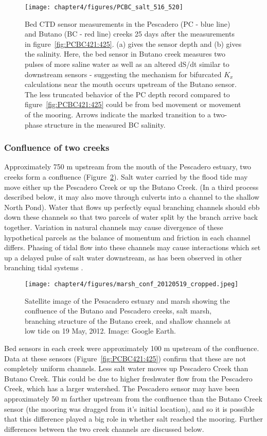 \begin{figure}
	\texttt{[image: chapter4/figures/PCBC\_salt\_516\_520]}
	\caption{Bed CTD sensor measurements in the Pescadero (PC - blue line) and Butano (BC - red line) creeks 25 days after the measurements in figure~\ref{fig:PCBC421:425}. (a) gives the sensor depth and (b) gives the salinity. Here, the bed sensor in Butano creek measures two pulses of more saline water as well as an altered dS/dt similar to downstream sensors - suggesting the mechanism for bifurcated $K_x$ calculations near the mouth occurs upstream of the Butano sensor. The less truncated behavior of the PC depth record compared to figure~\ref{fig:PCBC421:425} could be from bed movement or movement of the mooring. Arrows indicate the marked transition to a two-phase structure in the measured BC salinity.}  \label{fig:PCBC511:516}
\end{figure}


\subsubsection{Confluence of two creeks}
Approximately 750 m upstream from the mouth of the Pescadero estuary, two creeks form a confluence (Figure~\ref{fig:geMarsh}). Salt water carried by the flood tide may move either up the Pescadero Creek or up the Butano Creek. (In a third process described below, it may also move through culverts into a channel to the shallow North Pond). Water that flows up perfectly equal branching channels should ebb down these channels so that two parcels of water split by the branch arrive back together. Variation in natural channels may cause divergence of these hypothetical parcels as the balance of momentum and friction in each channel differs. Phasing of tidal flow into these channels may cause interactions which set up a delayed pulse of salt water downstream, as has been observed in other branching tidal systems \parencite{macvean_estuarine_2011}.


\begin{figure}
\centering
	\texttt{[image: chapter4/figures/marsh\_conf\_20120519\_cropped.jpeg]}
	\caption{Satellite image of the Pesacadero estuary and marsh showing the confluence of the Butano and Pescadero creeks, salt marsh, branching structure of the Butano creek, and shallow channels at low tide on 19 May, 2012. Image: Google Earth.} \label{fig:geMarsh}
\end{figure}

Bed sensors in each creek were approximately 100 m upstream of the confluence. Data at these sensors (Figure~\ref{fig:PCBC421:425}) confirm that these are not completely uniform channels. Less salt water moves up Pescadero Creek than Butano Creek. This could be due to higher freshwater flow from the Pescadero Creek, which has a larger watershed. The Pescadero sensor may have been approximately 50 m farther upstream from the confluence than the Butano Creek sensor (the mooring was dragged from it's initial location), and so it is possible that this difference played a big role in whether salt reached the mooring. Further differences between the two creek channels are discussed below.

